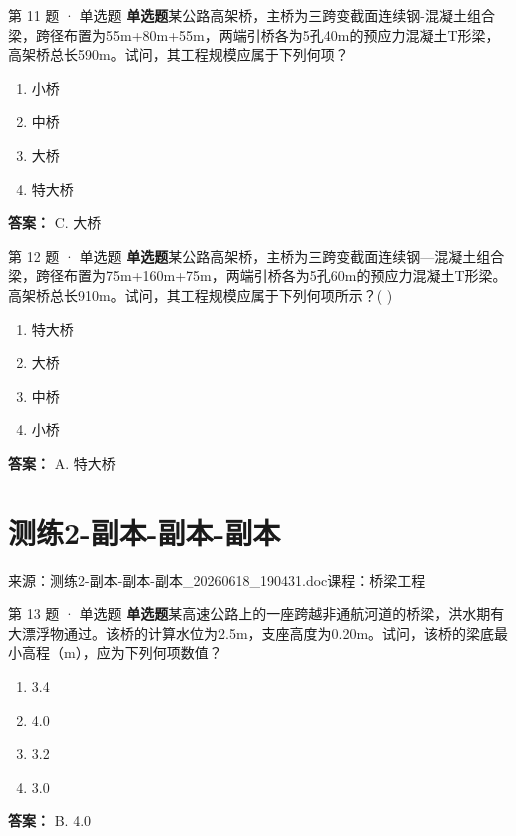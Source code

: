 \documentclass[UTF8,zihao=-4,openany]{ctexbook}
\newenvironment{choices}{\begin{enumerate}[label=\Alph*.,leftmargin=9mm,labelsep=3mm,itemsep=2pt,topsep=4pt]}{\end{enumerate}}
\newcommand{\qtype}[1]{\textcolor{brand}{\sffamily\bfseries #1}}
\newcommand{\sourcefile}[1]{\textcolor{muted}{\small\sffamily 来源：#1}}
\begin{document}
\begin{questionbox}{第 11 题 · 单选题}
\qtype{单选题}\quad 某公路高架桥，主桥为三跨变截面连续钢-混凝土组合梁，跨径布置为55m+80m+55m，两端引桥各为5孔40m的预应力混凝土T形梁，高架桥总长590m。试问，其工程规模应属于下列何项？
\begin{choices}
\item 小桥
\item 中桥
\item 大桥
\item 特大桥
\end{choices}
\begin{answerbox}
\textbf{答案：} C. 大桥
\end{answerbox}
\end{questionbox}

\begin{questionbox}{第 12 题 · 单选题}
\qtype{单选题}\quad 某公路高架桥，主桥为三跨变截面连续钢—混凝土组合梁，跨径布置为75m+160m+75m，两端引桥各为5孔60m的预应力混凝土T形梁。高架桥总长910m。试问，其工程规模应属于下列何项所示？( )
\begin{choices}
\item 特大桥
\item 大桥
\item 中桥
\item 小桥
\end{choices}
\begin{answerbox}
\textbf{答案：} A. 特大桥
\end{answerbox}
\end{questionbox}

\chapter{测练2-副本-副本-副本}

\sourcefile{测练2-副本-副本-副本\_20260618\_190431.doc}\quad \textcolor{muted}{\small\sffamily 课程：桥梁工程}

\begin{questionbox}{第 13 题 · 单选题}
\qtype{单选题}\quad 某高速公路上的一座跨越非通航河道的桥梁，洪水期有大漂浮物通过。该桥的计算水位为2.5m，支座高度为0.20m。试问，该桥的梁底最小高程（m），应为下列何项数值？
\begin{choices}
\item 3.4
\item 4.0
\item 3.2
\item 3.0
\end{choices}
\begin{answerbox}
\textbf{答案：} B. 4.0
\end{answerbox}
\end{questionbox}
\end{document}
